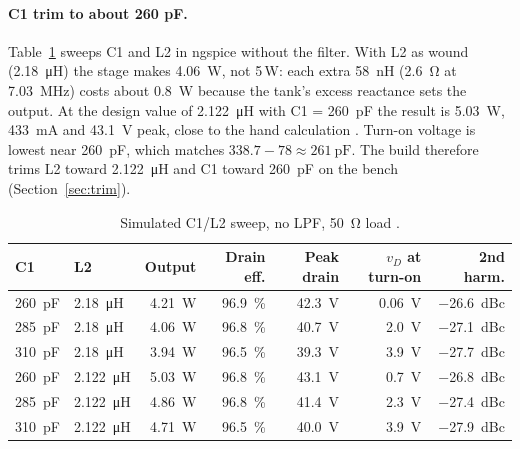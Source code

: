 \documentclass[11pt,letterpaper]{article}
\begin{document}
\paragraph{C1 trim to about 260 pF.}\label{sec:c1trim}
Table~\ref{tab:c1sweep} sweeps C1 and L2 in ngspice without the filter. With L2 as wound (\SI{2.18}{\micro\henry}) the stage makes \SI{4.06}{\watt}, not 5\,W: each extra \SI{58}{\nano\henry} (\SI{2.6}{\ohm} at \SI{7.03}{\mega\hertz}) costs about \SI{0.8}{\watt} because the tank's excess reactance sets the output. At the design value of \SI{2.122}{\micro\henry} with C1 = \SI{260}{\pico\farad} the result is \SI{5.03}{\watt}, \SI{433}{\milli\ampere} and \SI{43.1}{\volt} peak, close to the hand calculation \cite{projsim,projnotes}. Turn-on voltage is lowest near \SI{260}{\pico\farad}, which matches $338.7-78\approx\SI{261}{\pico\farad}$. The build therefore trims L2 toward \SI{2.122}{\micro\henry} and C1 toward \SI{260}{\pico\farad} on the bench (Section~\ref{sec:trim}).

\begin{table}[h]
\centering\small
\caption{Simulated C1/L2 sweep, no LPF, \SI{50}{\ohm} load \cite{projsim}.}\label{tab:c1sweep}
\begin{tabular}{@{}llrrrrr@{}}
\toprule
C1 & L2 & Output & Drain eff. & Peak drain & $v_D$ at turn-on & 2nd harm. \\ \midrule
\SI{260}{\pico\farad} & \SI{2.18}{\micro\henry} & \SI{4.21}{\watt} & \SI{96.9}{\percent} & \SI{42.3}{\volt} & \SI{0.06}{\volt} & \SI{-26.6}{dBc} \\
\SI{285}{\pico\farad} & \SI{2.18}{\micro\henry} & \SI{4.06}{\watt} & \SI{96.8}{\percent} & \SI{40.7}{\volt} & \SI{2.0}{\volt} & \SI{-27.1}{dBc} \\
\SI{310}{\pico\farad} & \SI{2.18}{\micro\henry} & \SI{3.94}{\watt} & \SI{96.5}{\percent} & \SI{39.3}{\volt} & \SI{3.9}{\volt} & \SI{-27.7}{dBc} \\
\SI{260}{\pico\farad} & \SI{2.122}{\micro\henry} & \SI{5.03}{\watt} & \SI{96.8}{\percent} & \SI{43.1}{\volt} & \SI{0.7}{\volt} & \SI{-26.8}{dBc} \\
\SI{285}{\pico\farad} & \SI{2.122}{\micro\henry} & \SI{4.86}{\watt} & \SI{96.8}{\percent} & \SI{41.4}{\volt} & \SI{2.3}{\volt} & \SI{-27.4}{dBc} \\
\SI{310}{\pico\farad} & \SI{2.122}{\micro\henry} & \SI{4.71}{\watt} & \SI{96.5}{\percent} & \SI{40.0}{\volt} & \SI{3.9}{\volt} & \SI{-27.9}{dBc} \\
\bottomrule
\end{tabular}
\end{table}
\end{document}
